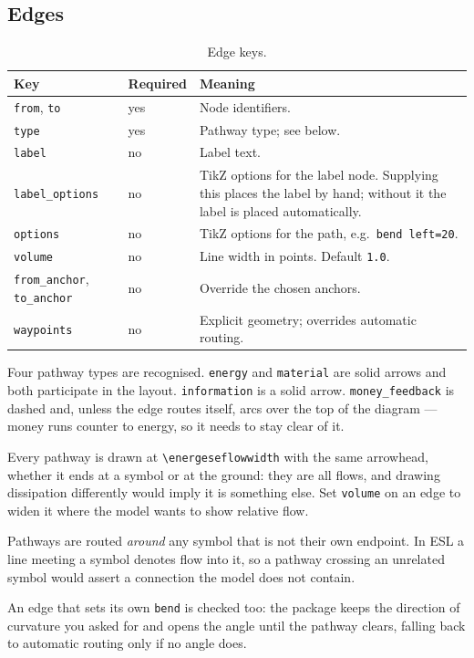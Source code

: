 \documentclass{article}
\begin{document}
\subsection{Edges}

\begin{table}[h]
\centering
\begin{tabular}{lll}
\toprule
Key & Required & Meaning \\
\midrule
\texttt{from}, \texttt{to} & yes & Node identifiers. \\
\texttt{type}              & yes & Pathway type; see below. \\
\texttt{label}             & no  & Label text. \\
\texttt{label\_options}    & no  & TikZ options for the label node. Supplying
this places the label by hand; without it the label is placed automatically. \\
\texttt{options}           & no  & TikZ options for the path, e.g.\ \texttt{bend left=20}. \\
\texttt{volume}            & no  & Line width in points. Default \texttt{1.0}. \\
\texttt{from\_anchor}, \texttt{to\_anchor} & no & Override the chosen anchors. \\
\texttt{waypoints}         & no  & Explicit geometry; overrides automatic routing. \\
\bottomrule
\end{tabular}
\caption{Edge keys.}
\end{table}

Four pathway types are recognised. \texttt{energy} and \texttt{material} are
solid arrows and both participate in the layout. \texttt{information} is a solid
arrow. \texttt{money\_feedback} is dashed and, unless the edge routes itself,
arcs over the top of the diagram --- money runs counter to energy, so it needs
to stay clear of it.

Every pathway is drawn at \verb|\energeseflowwidth| with the same arrowhead,
whether it ends at a symbol or at the ground: they are all flows, and drawing
dissipation differently would imply it is something else. Set \texttt{volume} on
an edge to widen it where the model wants to show relative flow.

Pathways are routed \emph{around} any symbol that is not their own endpoint. In
ESL a line meeting a symbol denotes flow into it, so a pathway crossing an
unrelated symbol would assert a connection the model does not contain.

An edge that sets its own \texttt{bend} is checked too: the package keeps the
direction of curvature you asked for and opens the angle until the pathway
clears, falling back to automatic routing only if no angle does.
\end{document}

